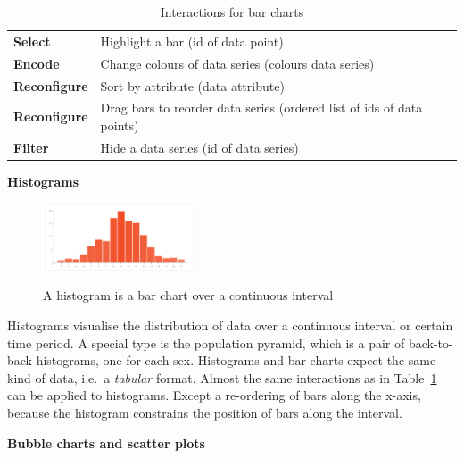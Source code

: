 \begin{table}
  \centering
  \caption{Interactions for bar charts}\label{tab:analysis:bar-charts:interactions}
  \begin{tabular}{ll}
    \bf Select & Highlight a bar (id of data point) \\
    \bf Encode & Change colours of data series (colours \rightarrow{} data series) \\
    \bf Reconfigure & Sort by attribute (data attribute) \\
    \bf Reconfigure & Drag bars to reorder data series (ordered list of ids of data points) \\
    \bf Filter & Hide a data series (id of data series) \\
  \end{tabular}
\end{table}

\textbf{Histograms}

\begin{figure}
  \centering
    \includegraphics[width=0.4\textwidth]{figures/analysis/histogram.png}%
    \label{fig:analysis:histograms}
    \caption{A histogram is a bar chart over a continuous interval}%
\end{figure}

Histograms visualise the distribution of data over a continuous interval or certain time period.
A special type is the population pyramid, which is a pair of back-to-back histograms, one for each sex.
Histograms and bar charts expect the same kind of data, i.e.\ a \emph{tabular} format.
Almost the same interactions as in Table~\ref{tab:analysis:bar-charts:interactions} can be applied to histograms.
Except a re-ordering of bars along the x-axis, because the histogram constrains the position of bars along the interval.

\textbf{Bubble charts and scatter plots}

